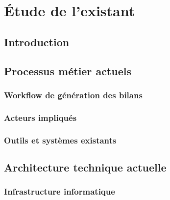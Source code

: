 
\chapter{Étude de l'existant}
\label{chap:existant}

\section{Introduction}


\section{Processus métier actuels}


\subsection{Workflow de génération des bilans}


\subsection{Acteurs impliqués}


\subsection{Outils et systèmes existants}


\section{Architecture technique actuelle}


\subsection{Infrastructure informatique}

